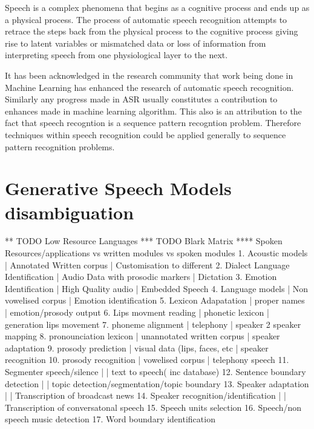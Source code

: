 Speech is a complex phenomena that begins as a cognitive process and ends up as a physical process.  The process of automatic speech recognition attempts to retrace the steps back from the physical process to the cognitive process giving rise to latent variables or mismatched data or loss of information from interpreting speech from one physiological layer to the next.

It has been acknowledged in the research community that work being done in Machine Learning has enhanced the research of automatic speech recognition.  Similarly any progress made in ASR usually constitutes a contribution to enhances made in machine learning algorithm.  This also is an attribution to the fact that speech recogntion is a sequence pattern recogntion problem.  Therefore techniques within speech recognition could be applied generally to sequence pattern recognition problems.

\iffalse
** TODO Uses of ASR ([[https://www.dropbox.com/s/ly7lwhljsxhuos1/forced_alignment_slides.pdf?dl=0][University of Oxford]]) 
- As a toolbox
- As a methodology
\fi

\section{Generative Speech Models disambiguation}
\pagestyle{fancy}
** TODO Low Resource Languages
*** TODO Blark Matrix
**** Spoken Resources/applications vs written modules vs spoken modules
1. Acoustic models | Annotated Written corpus | Customisation to different 
2. Dialect Language Identification | Audio Data with prosodic markers | Dictation
3. Emotion Identification | High Quality audio | Embedded Speech
4. Language models | Non vowelised corpus | Emotion identification
5. Lexicon Adapatation | proper names | emotion/prosody output
6. Lips movment reading | phonetic lexicon | generation lips movement
7. phoneme alignment | telephony | speaker 2 speaker mapping
8. pronounciation lexicon | unannotated written corpus | speaker adaptation 
9. prosody prediction | visual data (lips, faces, etc | speaker recognition
10. prosody recognition | vowelised corpus | telephony speech 
11. Segmenter speech/silence | | text to speech( inc database) 
12. Sentence boundary detection | | topic detection/segmentation/topic boundary
13. Speaker adaptation | | Transcription of broadcast news
14. Speaker recognition/identification | | Transcription of conversatonal speech
15. Speech units selection 
16. Speech/non speech music detection
17. Word boundary identification

